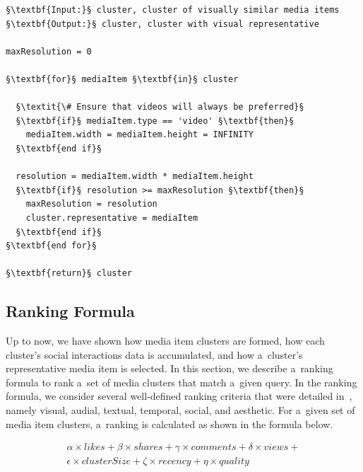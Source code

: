 \begin{lstlisting}[caption={[Pseudocode of the cluster visual representative selection algorithm]{Pseudocode of the cluster visual representative selection algorithm that finds the highest quality media item of a~cluster}},
  label=code:clusterrepresentative, float, escapechar=§]
§\textbf{Input:}§ cluster, cluster of visually similar media items
§\textbf{Output:}§ cluster, cluster with visual representative

maxResolution = 0

§\textbf{for}§ mediaItem §\textbf{in}§ cluster

  §\textit{\# Ensure that videos will always be preferred}§
  §\textbf{if}§ mediaItem.type == 'video' §\textbf{then}§
    mediaItem.width = mediaItem.height = INFINITY
  §\textbf{end if}§

  resolution = mediaItem.width * mediaItem.height
  §\textbf{if}§ resolution >= maxResolution §\textbf{then}§
    maxResolution = resolution
    cluster.representative = mediaItem
  §\textbf{end if}§
§\textbf{end for}§

§\textbf{return}§ cluster
\end{lstlisting}

\subsection{Ranking Formula}
\label{sec:introduction-of-a-ranking-formula}

Up to now, we have shown how media item clusters are formed,
how each cluster's social interactions data is accumulated,
and how a~cluster's representative media item is selected.
In this section, we describe a~ranking formula to rank
a~set of media clusters that match a~given query.
In the ranking formula, we consider several well-defined ranking criteria
that were detailed in~\cite{steiner2012definingaesthetic},
namely visual, audial, textual, temporal, social, and aesthetic.
For a~given set of media item clusters, a~ranking is calculated as shown in the formula below.

\begin{gather}\label{eq:rankingformula}
  \alpha \times \mathit{likes} + \beta \times \mathit{shares} +
  \gamma \times \mathit{comments} + \delta \times \mathit{views} + \nonumber\\
  \epsilon \times \mathit{clusterSize} + \zeta \times \mathit{recency} +
  \eta \times \mathit{quality}
\end{gather}

